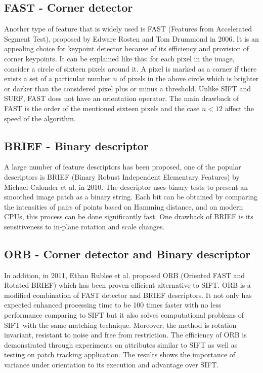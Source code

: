 \documentclass[letterpaper, 10 pt, conference]{ieeeconf}  %
\begin{document}
\subsection{FAST - Corner detector}
Another type of feature that is widely used is FAST (Features from Accelerated Segment Test), proposed by Edware Rosten and Tom Drummond in 2006\cite{fast}. It is an appealing choice for keypoint detector because of its efficiency and provision of corner keypoints. It can be explained like this: for each pixel in the image, consider a circle of sixteen pixels around it. A pixel is marked as a corner if there exists a set of a particular number $n$ of pixels in the above circle which is brighter or darker than the considered pixel plus or minus a threshold. Unlike SIFT and SURF, FAST does not have an orientation operator. The main drawback of FAST is\: the order of the mentioned sixteen pixels and the case $n<12$ affect the speed of the algorithm.\par
\subsection{BRIEF - Binary descriptor}
A large number of feature descriptors has been proposed, one of the popular descriptors is BRIEF (Binary Robust Independent Elementary Features) by Michael Calonder et al. in 2010\cite{brief}. The descriptor uses binary tests to present an smoothed image patch as a binary string. Each bit can be obtained by comparing the intensities of pairs of points based on Hamming distance, and on modern CPUs, this process can be done significantly fast. One drawback of BRIEF is its sensitiveness to in-plane rotation and scale changes. \par
\subsection{ORB - Corner detector and Binary descriptor}
In addition, in 2011, Ethan Rublee et al. proposed ORB (Oriented FAST and Rotated BRIEF)\cite{orb} which has been proven efficient alternative to SIFT. ORB is a modified combination of FAST detector and BRIEF descriptors. It not only has expected enhanced processing time to be 100 times faster with no less performance comparing to SIFT but it also solves computational problems of SIFT with the same matching technique. Moreover, the method is rotation invariant, resistant to noise and free from restriction. The efficiency of ORB is demonstrated through experiments on attributes similar to SIFT as well as testing on patch tracking application. The results shows the importance of variance under orientation to its execution and advantage over SIFT.
\end{document}
